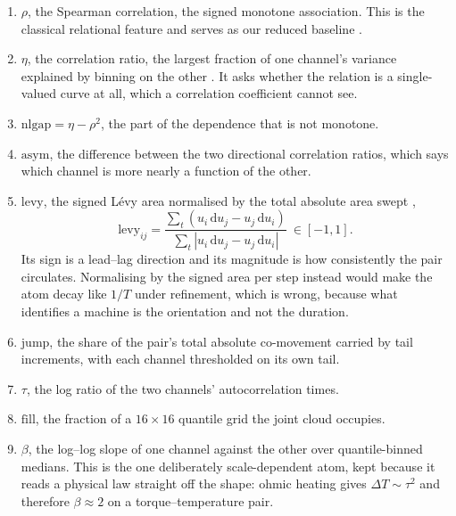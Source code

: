 \documentclass[11pt]{article}
\newcommand{\levy}{\mathrm{levy}}
\begin{document}
\begin{enumerate}
\item $\rho$, the Spearman correlation, the signed monotone association. This
is the classical relational feature and serves as our reduced baseline
\cite{spearman1904}.
\item $\eta$, the correlation ratio, the largest fraction of one channel's
variance explained by binning on the other \cite{pearson1905ratio}. It asks
whether the relation is a single-valued curve at all, which a correlation
coefficient cannot see.
\item $\mathrm{nlgap} = \eta - \rho^2$, the part of the dependence that is not
monotone.
\item $\mathrm{asym}$, the difference between the two directional correlation
ratios, which says which channel is more nearly a function of the other.
\item $\levy$, the signed L\'evy area normalised by the total absolute area
swept \cite{levy1951,lyons2007},
\[
\levy_{ij}
= \frac{\sum_t \left(u_i\,\mathrm{d}u_j - u_j\,\mathrm{d}u_i\right)}
       {\sum_t \left|u_i\,\mathrm{d}u_j - u_j\,\mathrm{d}u_i\right|}
\ \in [-1,1].
\]
Its sign is a lead--lag direction and its magnitude is how consistently the
pair circulates. Normalising by the signed area per step instead would make
the atom decay like $1/T$ under refinement, which is wrong, because what
identifies a machine is the orientation and not the duration.
\item $\mathrm{jump}$, the share of the pair's total absolute co-movement
carried by tail increments, with each channel thresholded on its own tail.
\item $\tau$, the log ratio of the two channels' autocorrelation times.
\item $\mathrm{fill}$, the fraction of a $16\times16$ quantile grid the joint
cloud occupies.
\item $\beta$, the log--log slope of one channel against the other over
quantile-binned medians. This is the one deliberately scale-dependent atom,
kept because it reads a physical law straight off the shape: ohmic heating
gives $\Delta T \sim \tau^2$ and therefore $\beta \approx 2$ on a
torque--temperature pair.
\end{enumerate}
\end{document}
